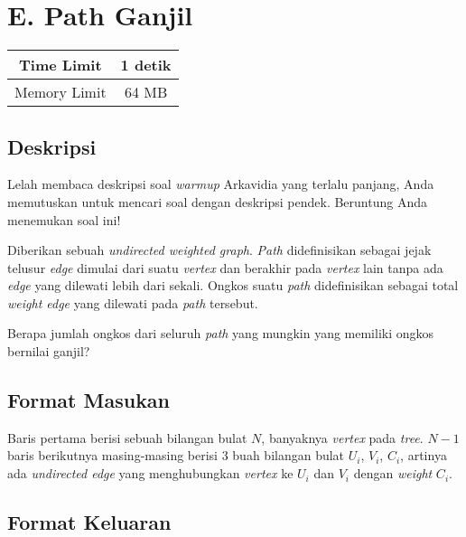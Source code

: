 \documentclass{article}
\begin{document}
\section*{\hfil E. Path Ganjil\hfil}

\begin{center}
\begin{tabular}{ |cc| } 
 \hline
 Time Limit & 1 detik \\ 
 \hline
 Memory Limit & 64 MB \\
 \hline
\end{tabular}
\end{center}

\subsection*{Deskripsi}
\par\noindent
Lelah membaca deskripsi soal  \textit{warmup} Arkavidia yang terlalu panjang, Anda memutuskan untuk mencari soal dengan deskripsi pendek. Beruntung Anda menemukan soal ini!
\newline
\par\noindent
Diberikan sebuah \textit{undirected weighted graph}.  \textit{Path} didefinisikan sebagai jejak telusur  \textit{edge} dimulai dari suatu  \textit{vertex} dan berakhir pada  \textit{vertex} lain tanpa ada  \textit{edge} yang dilewati lebih dari sekali. Ongkos suatu  \textit{path} didefinisikan sebagai total  \textit{weight edge} yang dilewati pada  \textit{path} tersebut. 
\newline
\par\noindent
Berapa jumlah ongkos dari seluruh  \textit{path} yang mungkin yang memiliki ongkos bernilai ganjil?

\subsection*{Format Masukan}
\par\noindent Baris pertama berisi sebuah bilangan bulat $N$, banyaknya  \textit{vertex} pada  \textit{tree}. $N-1$ baris berikutnya masing-masing berisi $3$ buah bilangan bulat $U_i$, $V_i$, $C_i$, artinya ada  \textit{undirected edge} yang menghubungkan  \textit{vertex} ke $U_i$ dan $V_i$ dengan  \textit{weight} $C_i$.

\subsection*{Format Keluaran}
\end{document}
